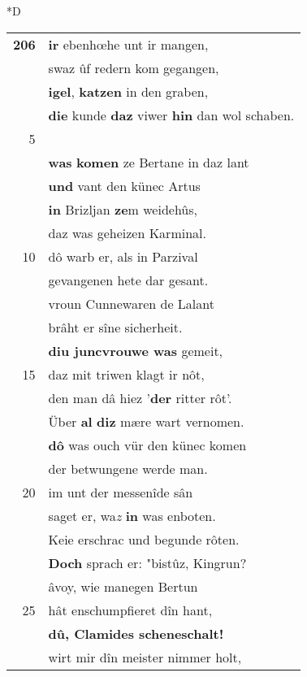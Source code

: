 \documentclass[8pt,a4paper,notitlepage]{article}
\begin{document}
\begin{table}[ht]
\begin{minipage}[t]{0.5\linewidth}
\small
\begin{center}*D
\end{center}
\begin{tabular}{rl}
\textbf{206} & \textbf{ir} ebenhœhe unt ir mangen,\\ 
 & swaz ûf redern kom gegangen,\\ 
 & \textbf{igel}, \textbf{katzen} in den graben,\\ 
 & \textbf{die} kunde \textbf{daz} viwer \textbf{hin} dan wol schaben.\\ 
5 & \textit{\begin{large}K\end{large}}ingrun \textbf{scheneschalt}\\ 
 & \textbf{was} \textbf{komen} ze Bertane in daz lant\\ 
 & \textbf{und} vant den künec Artus\\ 
 & \textbf{in} Brizljan \textbf{ze}m weidehûs,\\ 
 & daz was geheizen Karminal.\\ 
10 & dô warb er, als in Parzival\\ 
 & gevangenen hete dar gesant.\\ 
 & vroun Cunnewaren de Lalant\\ 
 & brâht er sîne sicherheit.\\ 
 & \textbf{diu juncvrouwe was} gemeit,\\ 
15 & daz mit triwen klagt ir nôt,\\ 
 & den man dâ hiez '\textbf{der} ritter rôt'.\\ 
 & Über \textbf{al} \textbf{diz} mære wart vernomen.\\ 
 & \textbf{dô} was ouch vür den künec komen\\ 
 & der betwungene werde man.\\ 
20 & im unt der messenîde sân\\ 
 & saget er, wa\textit{z} \textbf{in} was enboten.\\ 
 & Keie erschrac und begunde rôten.\\ 
 & \textbf{Doch} sprach er: "bistûz, Kingrun?\\ 
 & âvoy, wie manegen Bertun\\ 
25 & hât enschumpfieret dîn hant,\\ 
 & \textbf{dû, Clamides scheneschalt!}\\ 
 & wirt mir dîn meister nimmer holt,\\ 

\end{tabular}
\end{minipage}
\end{table}
\end{document}
